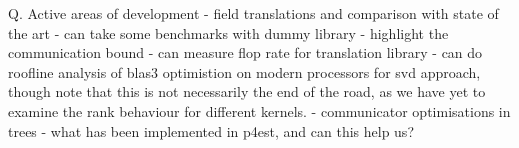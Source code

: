 Q. Active areas of development
    - field translations and comparison with state of the art
        - can take some benchmarks with dummy library
        - highlight the communication bound
        - can measure flop rate for translation library
        - can do roofline analysis of blas3 optimistion on modern
        processors for svd approach, though note that this is not
        necessarily the end of the road, as we have yet to examine
        the rank behaviour for different kernels.
    - communicator optimisations in trees
        - what has been implemented in p4est, and can this help us?


